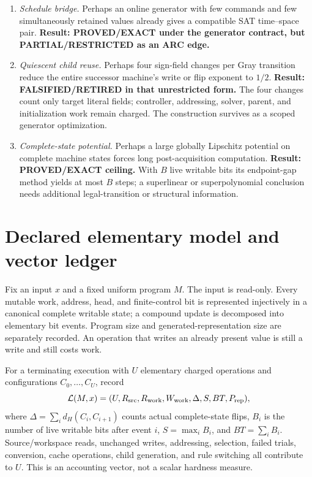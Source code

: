 \documentclass[11pt]{article}
\begin{document}
\begin{enumerate}[label=\textbf{M\arabic*.},leftmargin=*]
\item \emph{Schedule bridge.}  Perhaps an online generator with few commands and few simultaneously retained values already gives a compatible SAT time--space pair.  \textbf{Result: PROVED/EXACT under the generator contract, but PARTIAL/RESTRICTED as an ARC edge.}
\item \emph{Quiescent child reuse.}  Perhaps four sign-field changes per Gray transition reduce the entire successor machine's write or flip exponent to $1/2$.  \textbf{Result: FALSIFIED/RETIRED in that unrestricted form.}  The four changes count only target literal fields; controller, addressing, solver, parent, and initialization work remain charged.  The construction survives as a scoped generator optimization.
\item \emph{Complete-state potential.}  Perhaps a large globally Lipschitz potential on complete machine states forces long post-acquisition computation.  \textbf{Result: PROVED/EXACT ceiling.}  With $B$ live writable bits its endpoint-gap method yields at most $B$ steps; a superlinear or superpolynomial conclusion needs additional legal-transition or structural information.
\end{enumerate}

\section{Declared elementary model and vector ledger}

Fix an input $x$ and a fixed uniform program $M$.  The input is read-only.  Every mutable work, address, head, and finite-control bit is represented injectively in a canonical complete writable state; a compound update is decomposed into elementary bit events.  Program size and generated-representation size are separately recorded.  An operation that writes an already present value is still a write and still costs work.

For a terminating execution with $U$ elementary charged operations and configurations $C_0,\ldots,C_U$, record
\[
 \mathcal L(M,x)=
 (U,R_{\rm src},R_{\rm work},W_{\rm work},\Delta,S,BT,P_{\rm rep}),
\]
where $\Delta=\sum_i d_H(C_i,C_{i+1})$ counts actual complete-state flips, $B_i$ is the number of live writable bits after event $i$, $S=\max_iB_i$, and $BT=\sum_iB_i$.  Source/workspace reads, unchanged writes, addressing, selection, failed trials, conversion, cache operations, child generation, and rule switching all contribute to $U$.  This is an accounting vector, not a scalar hardness measure.
\end{document}
